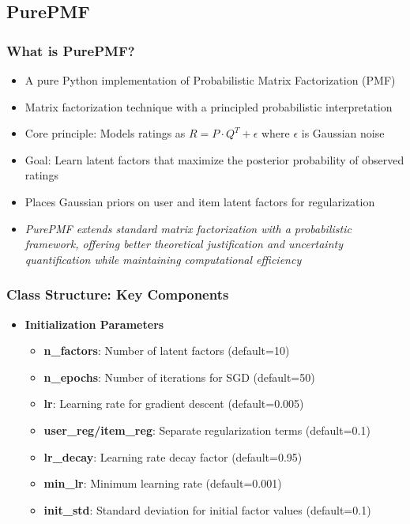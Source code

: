 \documentclass{beamer}
\begin{document}
\subsection{PurePMF}
\begin{frame}
\frametitle{What is PurePMF?}

\begin{itemize}
    \item A pure Python implementation of Probabilistic Matrix Factorization (PMF)
    \item Matrix factorization technique with a principled probabilistic interpretation
    \item Core principle: Models ratings as $R = P \cdot Q^T + \epsilon$ where $\epsilon$ is Gaussian noise
    \item Goal: Learn latent factors that maximize the posterior probability of observed ratings
    \item Places Gaussian priors on user and item latent factors for regularization
    
    \vspace{1cm}

    \item \textit{PurePMF extends standard matrix factorization with a probabilistic framework, offering better theoretical justification and uncertainty quantification while maintaining computational efficiency}
\end{itemize}
\end{frame}

\begin{frame}
\frametitle{Class Structure: Key Components}

\begin{itemize}
    \item \textbf{Initialization Parameters}
    \begin{itemize}
        \item \textbf{n\_factors}: Number of latent factors (default=10)
        \item \textbf{n\_epochs}: Number of iterations for SGD (default=50)
        \item \textbf{lr}: Learning rate for gradient descent (default=0.005)
        \item \textbf{user\_reg/item\_reg}: Separate regularization terms (default=0.1)
        \item \textbf{lr\_decay}: Learning rate decay factor (default=0.95)
        \item \textbf{min\_lr}: Minimum learning rate (default=0.001)
        \item \textbf{init\_std}: Standard deviation for initial factor values (default=0.1)
    \end{itemize}
\end{itemize}
\end{frame}
\end{document}
